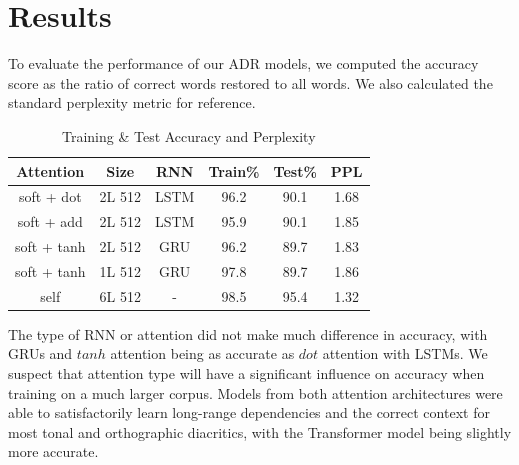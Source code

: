 \documentclass[a4paper]{article}
\begin{document}
\section{Results}
To evaluate the performance of our ADR models, we computed the accuracy score as the ratio of correct words restored to all words. We also calculated the standard perplexity metric for reference.
 \begin{table}[h]
  \caption{Training \& Test Accuracy and Perplexity}
  \label{tab:results}
  \centering
  \begin{tabular}{cccccc}
    \toprule
    \textbf{Attention} & \textbf{Size} & \textbf{RNN} & \textbf{Train\%} & \textbf{Test\%} &\textbf{PPL} \\
    \midrule
    soft + dot & 2L 512 & LSTM & 96.2 & 90.1 & 1.68 \\
    soft + add & 2L 512 & LSTM & 95.9 & 90.1 & 1.85 \\
	soft + tanh & 2L 512 & GRU & 96.2 & 89.7 & 1.83 \\ 
	soft + tanh & 1L 512 & GRU  & 97.8 & 89.7 & 1.86 \\ 
	\midrule
    self & 6L 512   & -  & 98.5 & 95.4 & 1.32 \\
    \bottomrule
  \end{tabular}
\end{table}
The type of RNN or attention did not make much difference in accuracy, with GRUs and $tanh$ attention being as accurate as $dot$ attention with LSTMs. We suspect that attention type will have a significant influence on accuracy when training on a much larger corpus. Models from both attention architectures were able to satisfactorily learn long-range dependencies and the correct context for most tonal and orthographic diacritics, with the Transformer model being slightly more accurate.  
\end{document}
